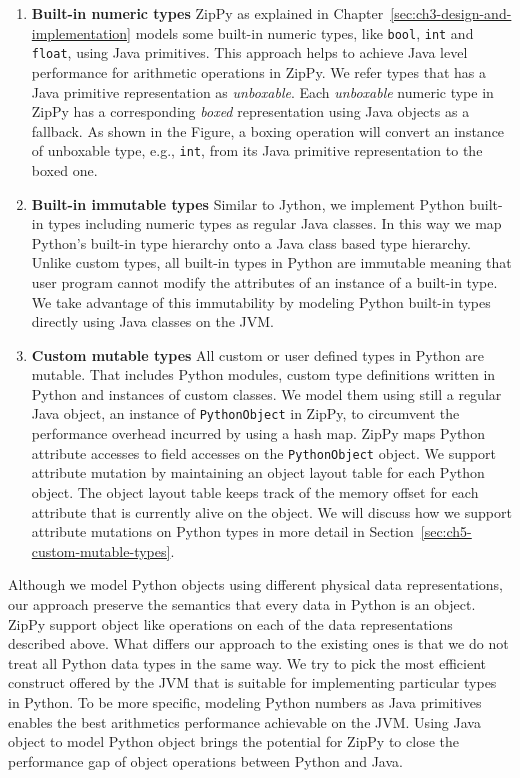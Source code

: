 \begin{enumerate}

\item \textbf{Built-in numeric types}
ZipPy as explained in Chapter~\ref{sec:ch3-design-and-implementation} models some built-in numeric types, like \texttt{bool}, \texttt{int} and \texttt{float}, using Java primitives.
This approach helps to achieve Java level performance for arithmetic operations in ZipPy.
We refer types that has a Java primitive representation as \emph{unboxable}.
Each \emph{unboxable} numeric type in ZipPy has a corresponding \emph{boxed} representation using Java objects as a fallback.
As shown in the Figure, a boxing operation will convert an instance of unboxable type, e.g., \texttt{int}, from its Java primitive representation to the boxed one.

\item \textbf{Built-in immutable types}
Similar to Jython, we implement Python built-in types including numeric types as regular Java classes.
In this way we map Python's built-in type hierarchy onto a Java class based type hierarchy.
Unlike custom types, all built-in types in Python are immutable meaning that user program cannot modify the attributes of an instance of a built-in type.
We take advantage of this immutability by modeling Python built-in types directly using Java classes on the JVM.

\item \textbf{Custom mutable types}
All custom or user defined types in Python are mutable.
That includes Python modules, custom type definitions written in Python and instances of custom classes.
We model them using still a regular Java object, an instance of \texttt{PythonObject} in ZipPy, to circumvent the performance overhead incurred by using a hash map.
ZipPy maps Python attribute accesses to field accesses on the \texttt{PythonObject} object.
We support attribute mutation by maintaining an object layout table for each Python object.
The object layout table keeps track of the memory offset for each attribute that is currently alive on the object.
We will discuss how we support attribute mutations on Python types in more detail in Section~\ref{sec:ch5-custom-mutable-types}.

\end{enumerate}

Although we model Python objects using different physical data representations, our approach preserve the semantics that every data in Python is an object.
ZipPy support object like operations on each of the data representations described above.
What differs our approach to the existing ones is that we do not treat all Python data types in the same way.
We try to pick the most efficient construct offered by the JVM that is suitable for implementing particular types in Python.
To be more specific, modeling Python numbers as Java primitives enables the best arithmetics performance achievable on the JVM.
Using Java object to model Python object brings the potential for ZipPy to close the performance gap of object operations between Python and Java.

